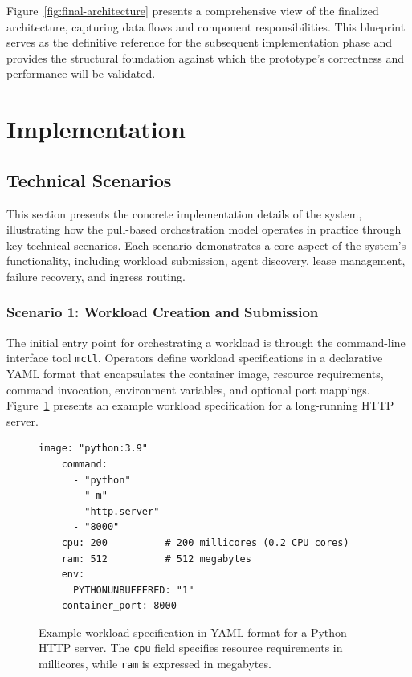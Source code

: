 Figure~\ref{fig:final-architecture} presents a comprehensive view of the finalized architecture, capturing data flows and component responsibilities. This blueprint serves as the definitive reference for the subsequent implementation phase and provides the structural foundation against which the prototype’s correctness and performance will be validated.

\section{Implementation}

\subsection{Technical Scenarios}

This section presents the concrete implementation details of the system, illustrating how the pull-based orchestration model operates in practice through key technical scenarios. Each scenario demonstrates a core aspect of the system's functionality, including workload submission, agent discovery, lease management, failure recovery, and ingress routing.

\subsubsection{Scenario 1: Workload Creation and Submission}

The initial entry point for orchestrating a workload is through the command-line interface tool \texttt{mctl}. Operators define workload specifications in a declarative YAML format that encapsulates the container image, resource requirements, command invocation, environment variables, and optional port mappings. Figure~\ref{fig:workload-spec} presents an example workload specification for a long-running HTTP server.

\begin{figure}[h]
\centering
\begin{lstlisting}[style=yaml]
    image: "python:3.9"
    command:
      - "python"
      - "-m"
      - "http.server"
      - "8000"
    cpu: 200          # 200 millicores (0.2 CPU cores)
    ram: 512          # 512 megabytes
    env:
      PYTHONUNBUFFERED: "1"
    container_port: 8000
\end{lstlisting}
\caption{Example workload specification in YAML format for a Python HTTP server. The \texttt{cpu} field specifies resource requirements in millicores, while \texttt{ram} is expressed in megabytes.}
\label{fig:workload-spec}
\end{figure}


